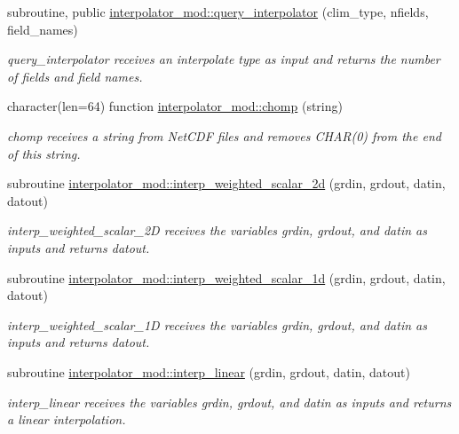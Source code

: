 \begin{DoxyCompactItemize}
subroutine, public \hyperlink{namespaceinterpolator__mod_a048095c591ef4051abfa1da6ebdbf3d9}{interpolator\+\_\+mod\+::query\+\_\+interpolator} (clim\+\_\+type, nfields, field\+\_\+names)
\begin{DoxyCompactList}\small\item\em query\+\_\+interpolator receives an interpolate type as input and returns the number of fields and field names. \end{DoxyCompactList}\item 
character(len=64) function \hyperlink{namespaceinterpolator__mod_aa04edf3968e85b9668bf62703731acdc}{interpolator\+\_\+mod\+::chomp} (string)
\begin{DoxyCompactList}\small\item\em chomp receives a string from Net\+C\+DF files and removes C\+H\+A\+R(0) from the end of this string. \end{DoxyCompactList}\item 
subroutine \hyperlink{namespaceinterpolator__mod_a65bb3b15489368783390f1fe8dcd1348}{interpolator\+\_\+mod\+::interp\+\_\+weighted\+\_\+scalar\+\_\+2d} (grdin, grdout, datin, datout)
\begin{DoxyCompactList}\small\item\em interp\+\_\+weighted\+\_\+scalar\+\_\+2D receives the variables grdin, grdout, and datin as inputs and returns datout. \end{DoxyCompactList}\item 
subroutine \hyperlink{namespaceinterpolator__mod_a3afd6e8f20a531fd96730e8222b3a9ad}{interpolator\+\_\+mod\+::interp\+\_\+weighted\+\_\+scalar\+\_\+1d} (grdin, grdout, datin, datout)
\begin{DoxyCompactList}\small\item\em interp\+\_\+weighted\+\_\+scalar\+\_\+1D receives the variables grdin, grdout, and datin as inputs and returns datout. \end{DoxyCompactList}\item 
subroutine \hyperlink{namespaceinterpolator__mod_ac3ca9de401cf09ffba68bd1c8a58f949}{interpolator\+\_\+mod\+::interp\+\_\+linear} (grdin, grdout, datin, datout)
\begin{DoxyCompactList}\small\item\em interp\+\_\+linear receives the variables grdin, grdout, and datin as inputs and returns a linear interpolation. \end{DoxyCompactList}\end{DoxyCompactItemize}
